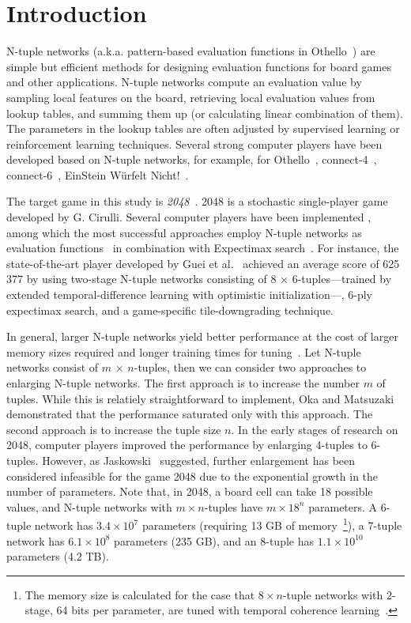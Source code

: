 \section{Introduction}

N-tuple networks (a.k.a. pattern-based evaluation functions in Othello~\cite{Buro98}) are simple but
efficient methods for designing evaluation functions for board games and other applications.
N-tuple networks compute an evaluation value by sampling local features on the board, retrieving local evaluation values from lookup tables, and summing them up (or calculating linear combination of them).
The parameters in the lookup tables are often adjusted by supervised learning or reinforcement learning techniques.
Several strong computer players have been developed based on N-tuple networks, for example,  for Othello~\cite{Buro98,Jask14,NgIL12,KuSM25}, \mbox{connect-4}~\cite{ThKK12}, connect-6~\cite{HuQP18}, EinStein W\"urfelt Nicht!~\cite{CHHH24,HsHs25}.

The target game in this study is \emph{2048}~\cite{2048}.
2048 is a stochastic single-player game developed by G. Cirulli.
Several computer players have been implemented \cite{Mats21,ASOH22,GuCW22,SzJa14,YWHC16,Jask18,KGWW22,Zhou19,WaMa25}, among which the most successful approaches employ N-tuple networks as evaluation functions~\cite{SzJa14} in combination with Expectimax search~\cite{YWHC16}.
For instance, the state-of-the-art player developed by Guei et al.~\cite{GuCW22} achieved an average score of 625\,377 by using two-stage N-tuple networks consisting of 8 $\times$ 6-tuples---trained by extended temporal-difference learning with optimistic initialization---, 6-ply expectimax search, and a game-specific tile-downgrading technique.


In general, larger N-tuple networks yield better performance at the cost of larger memory sizes required and longer training times for tuning~\cite{TeMa25}.
Let N-tuple networks consist of $m$ $\times$ $n$-tuples, then we can consider two approaches to enlarging N-tuple networks.
The first approach is to increase the number $m$ of tuples.  While this is relatiely straightforward to implement, Oka and Matsuzaki~\cite{OkMa16} demonstrated that the performance saturated only with this approach.
The second approach is to increase the tuple size $n$.  In the early stages of research on 2048, computer players improved the performance by enlarging 4-tuples to 6-tuples.  However, as Jaskowski~\cite{Jask18} suggested, further enlargement has been considered infeasible for the game 2048 due to the exponential growth in the number of parameters.  Note that, in 2048, a board cell can take 18 possible values, and N-tuple networks with $m$\,$\times$\,$n$-tuples have $m\times 18^n$ parameters.  A 6-tuple network has $3.4\times 10^7$ parameters (requiring 13 GB of memory~\footnote{The memory size is calculated for the case that 8\,$\times$\,$n$-tuple networks with 2-stage, 64 bits per parameter, are tuned with temporal coherence learning~\cite{Jask18}.}), a 7-tuple network has $6.1\times 10^8$ parameters (235 GB), and an 8-tuple has $1.1\times 10^{10}$ parameters (4.2 TB).


